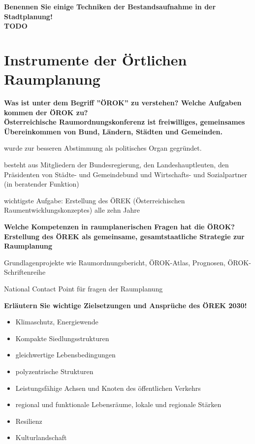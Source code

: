 \documentclass[]{article}
\newenvironment{question}{\vspace{8mm}\noindent\bfseries}{\\}
\begin{document}
\begin{question}
	Benennen Sie einige Techniken der Bestandsaufnahme in der Stadtplanung!
\end{question}
TODO


\section{Instrumente der Örtlichen Raumplanung}
\begin{question}
	Was ist unter dem Begriff ''ÖROK'' zu verstehen? Welche Aufgaben kommen der ÖROK zu?
\end{question}
Österreichische Raumordnungskonferenz ist freiwilliges, gemeinsames Übereinkommen von Bund, Ländern, Städten und Gemeinden.

wurde zur besseren Abstimmung als politisches Organ gegründet.

besteht aus Mitgliedern der Bundesregierung, den Landeshauptleuten, den Präsidenten von Städte- und Gemeindebund und Wirtschafts- und Sozialpartner (in beratender Funktion)

wichtigste Aufgabe: Erstellung des ÖREK (Österreichischen Raumentwicklungskonzeptes) alle zehn Jahre



\begin{question}
	Welche Kompetenzen in raumplanerischen Fragen hat die ÖROK?
\end{question}
Erstellung des ÖREK als gemeinsame, gesamtstaatliche Strategie zur Raumplanung

Grundlagenprojekte wie Raumordnungsbericht, ÖROK-Atlas, Prognosen, ÖROK-Schriftenreihe

National Contact Point für fragen der Raumplanung


\begin{question}
	Erläutern Sie wichtige Zielsetzungen und Ansprüche des ÖREK 2030!
\end{question}
\begin{itemize}
	\item Klimaschutz, Energiewende
	\item Kompakte Siedlungsstrukturen
	\item gleichwertige Lebensbedingungen
	\item polyzentrische Strukturen
	\item Leistungsfähige Achsen und Knoten des öffentlichen Verkehrs
	\item regional und funktionale Lebensräume, lokale und regionale Stärken
	\item Resilienz
	\item Kulturlandschaft
\end{itemize}
\end{document}
